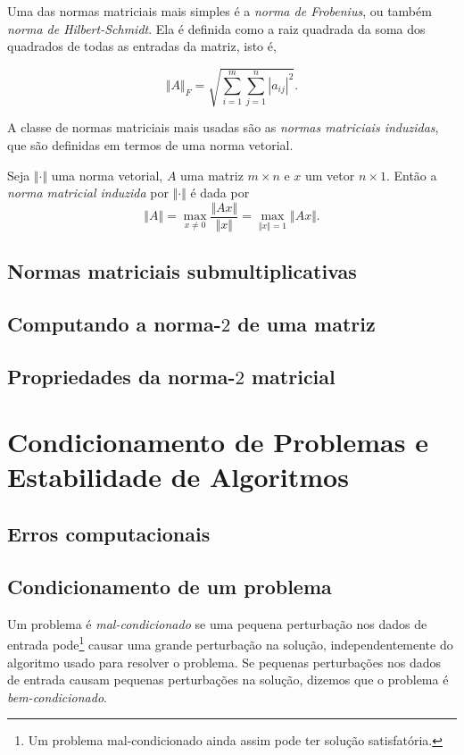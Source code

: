 \documentclass{article}
\begin{document}
Uma das normas matriciais mais simples é a \emph{norma de Frobenius}, ou também \emph{norma de Hilbert-Schmidt}. Ela é definida como a raiz quadrada da soma dos quadrados de todas as entradas da matriz, isto é,

\[
    \Vert A \Vert_F = \sqrt{\sum_{i=1}^m \sum_{j=1}^n |a_{ij}|^2}.
\]

A classe de normas matriciais mais usadas são as \emph{normas matriciais induzidas}, que são definidas em termos de uma norma vetorial.

\begin{defn}
    Seja \(\Vert \cdot \Vert\) uma norma vetorial, \(A\) uma matriz \(m \times n\) e \(x\) um vetor \(n \times 1\). Então a \emph{norma matricial induzida} por \(\Vert \cdot \Vert\) é dada por
    \begin{equation}
        \Vert A \Vert = \max_{x \neq 0} \frac{\Vert Ax \Vert}{\Vert x \Vert} = \max_{\Vert x \Vert = 1} \Vert Ax \Vert.
    \end{equation}
\end{defn}

\subsection{Normas matriciais submultiplicativas}
\subsection{Computando a norma-\(2\) de uma matriz}
\subsection{Propriedades da norma-\(2\) matricial}

\section{Condicionamento de Problemas e Estabilidade de Algoritmos}

\subsection{Erros computacionais}
\subsection{Condicionamento de um problema}

\begin{defn}
    Um problema é \emph{mal-condicionado} se uma pequena perturbação nos dados de entrada pode\footnote{Um problema mal-condicionado ainda assim pode ter solução satisfatória.} causar uma grande perturbação na solução, independentemente do algoritmo usado para resolver o problema. Se pequenas perturbações nos dados de entrada causam pequenas perturbações na solução, dizemos que o problema é \emph{bem-condicionado}.
\end{defn}
\end{document}
